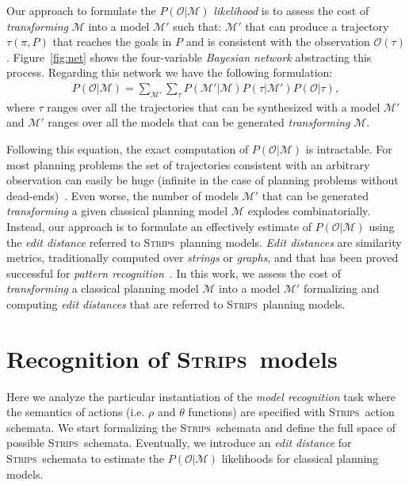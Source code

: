 \documentclass[letterpaper]{article} %
\newcommand{\strips}{\textsc{Strips}}     %
\begin{document}
Our approach to formulate the $P(\mathcal{O}|\mathcal{M})$ {\em likelihood} is to assess the cost of {\em transforming} $\mathcal{M}$ into a model $\mathcal{M'}$ such that: $\mathcal{M'}$ that can produce a trajectory $\tau(\pi,P)$ that reaches the goals in $P$ and is consistent with the observation $\mathcal{O}(\tau)$. Figure~\ref{fig:net} shows the four-variable {\em Bayesian network} abstracting this process. Regarding this network we have the following formulation:
\begin{align}
 P(\mathcal{O}|\mathcal{M})=\sum_{\mathcal{M}'}\sum_{\tau} P(\mathcal{M'}|\mathcal{M})P(\tau|\mathcal{M'})P(\mathcal{O}|\tau),
\end{align}
where $\tau$ ranges over all the trajectories that can be synthesized with a model $\mathcal{M}'$ and $\mathcal{M}'$ ranges over all the models that can be generated {\em transforming} $\mathcal{M}$.

Following this equation, the exact computation of $P(\mathcal{O}|\mathcal{M})$ is intractable. For most planning problems the set of trajectories consistent with an arbitrary observation can easily be huge (infinite in the case of planning problems without dead-ends)~\cite{lesh1995sound}. Even worse, the number of models $\mathcal{M}'$ that can be generated {\em transforming} a given classical planning model $\mathcal{M}$ explodes combinatorially. Instead, our approach is to formulate an effectively estimate of $P(\mathcal{O}|\mathcal{M})$ using the {\em edit distance} referred to \strips\ planning models. {\em Edit distances} are similarity metrics, traditionally computed over {\em strings} or {\em graphs}, and that has been proved successful for {\em pattern recognition}~\cite{masek1980faster,bunke1997relation}. In this work, we assess the cost of {\em transforming} a classical planning model $\mathcal{M}$ into a model $\mathcal{M'}$ formalizing and computing {\em edit distances} that are referred to \strips\ planning models. 


\section{Recognition of \strips\ models}
\label{sec:asPlanning}
Here we analyze the particular instantiation of the {\em model recognition} task where the semantics of actions (i.e. $\rho$ and $\theta$ functions) are specified with \strips\ action schemata. We start formalizing the \strips\ schemata and define the full space of possible \strips\ schemata. Eventually, we introduce an {\em edit distance} for \strips\ schemata to estimate the $P(\mathcal{O}|\mathcal{M})$ likelihoods for classical planning models.
\end{document}
